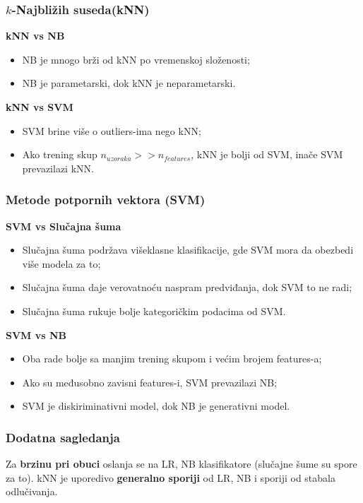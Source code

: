 \documentclass[fontsize=12bp, paper=a4]{scrarticle}
\begin{document}
\subsubsection{$k$-Najbližih suseda(kNN)}
\textbf{kNN vs NB}
\begin{itemize}
    \item NB je mnogo brži od kNN po vremenskoj složenosti;
    \item NB je parametarski, dok kNN je neparametarski.
\end{itemize}

\textbf{kNN vs SVM}
\begin{itemize}
    \item SVM brine više  o outliers-ima nego kNN;
    \item Ako trening skup $n_{uzoraka} >> n_{features}$, kNN je bolji od SVM, inače SVM prevazilazi kNN.
\end{itemize}

\subsubsection{Metode potpornih vektora (SVM)}
\textbf{SVM vs Slučajna šuma}
\begin{itemize}
    \item Slučajna šuma podržava višeklasne klasifikacije, gde SVM mora da obezbedi više modela za to;
    \item Slučajna šuma daje verovatnoću naspram predviđanja, dok SVM to ne radi;
    \item Slučajna šuma rukuje bolje kategoričkim podacima od SVM.
\end{itemize}

\textbf{SVM vs NB}
\begin{itemize}
    \item Oba rade bolje sa manjim trening skupom i većim brojem features-a;
    \item Ako su međusobno zavisni features-i, SVM prevazilazi NB;
    \item SVM je diskiriminativni model, dok NB je generativni model.
\end{itemize}

\subsubsection*{Dodatna sagledanja}
Za \textbf{brzinu pri obuci} oslanja se na LR, NB klasifikatore (slučajne šume su spore za to). kNN je uporedivo \textbf{generalno sporiji} od LR, NB i sporiji od stabala odlučivanja. 
\end{document}
